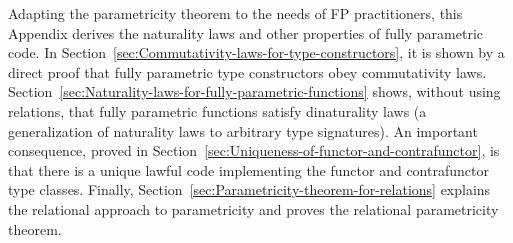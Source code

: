 Adapting the parametricity theorem to the needs of FP practitioners,
this Appendix derives the naturality laws and other properties of
fully parametric code. In Section~\ref{sec:Commutativity-laws-for-type-constructors},
it is shown by a direct proof that fully parametric type constructors
obey commutativity laws. Section~\ref{sec:Naturality-laws-for-fully-parametric-functions}
shows, without using relations, that fully parametric functions satisfy
dinaturality laws (a generalization of naturality laws to arbitrary
type signatures). An important consequence, proved in Section~\ref{sec:Uniqueness-of-functor-and-contrafunctor},
is that there is a unique lawful code implementing the functor and
contrafunctor type classes. Finally, Section~\ref{sec:Parametricity-theorem-for-relations}
explains the relational approach to parametricity and proves the relational
parametricity theorem. %
\begin{comment}
Additional literature:

{[}1{]}: Girard, J.-Y.; Scedrov, A. \& Scott, P. J. Normal Forms and
Cut-Free Proofs as Natural Transformations. Logic From Computer Science,
Mathematical Science Research Institute Publications 21, Springer-Verlag,
1992, 217-241. http://citeseer.ist.psu.edu/viewdoc/summary?doi=10.1.1.41.811

{[}2{]}: Bainbridge, E. S.; Freyd, P. J.; Scedrov, A. \& Scott, P.
J. Functorial polymorphism. Theoretical computer science, Elsevier,
1990, 70, 35-64. https://core.ac.uk/display/82270459

{[}3{]}: De Lataillade, J. Dinatural Terms in System F. Logic in Computer
Science, 24th Annual IEEE Symposium, 267-276, 2009. https://www.irif.fr/\textasciitilde delatail/dinat.pdf

{[}4{]}: Pistone, P. On completeness and parametricity in the realizability
semantics of System F. https://arxiv.org/abs/1802.05143

See discussion here: https://cstheory.stackexchange.com/questions/42256/is-case-analysis-on-normal-forms-of-lambda-terms-sufficient-to-prove-parametrici
\end{comment}

